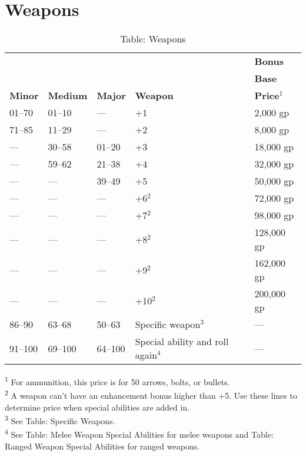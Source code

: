 \section{Weapons}

\label{f0}		

\begin{table}[]
\sffamily
\caption{Table: Weapons}
\setlength{\tabcolsep}{1pt}
\begin{tabularx}{\linewidth}{lllXl}
               &                 &                &                 & \textbf{Bonus} \\
               &                 &                &                 & \textbf{Base} \\
\textbf{Minor} & \textbf{Medium} & \textbf{Major} & \textbf{Weapon} & \textbf{Price\(^{1}\)}\\
01--70 & 01--10 & --- & +1 & 2,000 gp\\
71--85 & 11--29 & --- & +2 & 8,000 gp\\
--- & 30--58 & 01--20 & +3 & 18,000 gp\\
--- & 59--62 & 21--38 & +4 & 32,000 gp\\
--- & --- & 39--49 & +5 & 50,000 gp\\
--- & --- & --- & +6\(^{2}\) & 72,000 gp\\
--- & --- & --- & +7\(^{2}\) & 98,000 gp\\
--- & --- & --- & +8\(^{2}\) & 128,000 gp\\
--- & --- & --- & +9\(^{2}\) & 162,000 gp\\
--- & --- & --- & +10\(^{2}\) & 200,000 gp\\
86--90 & 63--68 & 50--63 & Specific weapon\(^{3}\) & ---\\
91--100 & 69--100 & 64--100 & Special ability and roll again\(^{4}\) & ---\\
\end{tabularx}
\textsuperscript{1} For ammunition, this price is for 50 arrows, bolts, or bullets. \\
\textsuperscript{2} A weapon can't have an enhancement bonus higher than +5. Use these lines to determine price when special abilities are added in. \\
\textsuperscript{3} See Table: Specific Weapons. \\
\textsuperscript{4} See Table: Melee Weapon Special Abilities for melee weapons and Table: Ranged Weapon Special Abilities for ranged weapons.\\
\end{table}	

